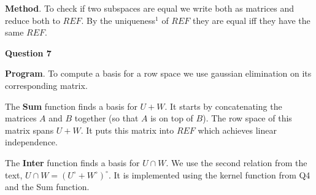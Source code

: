 \documentclass[14pt]{extarticle}
\begin{document}
\textbf{Method}. To check if two subspaces are equal we write both as matrices and reduce both to $REF$. By the uniqueness$^1$ of $REF$ they are equal iff they have the same $REF$.

\pagebreak
\begin{center}
\textbf{Question 7}
\end{center}

\textbf{Program}. To compute a basis for a row space we use gaussian elimination on its corresponding matrix. 

The \textbf{Sum} function finds a basis for $U+W$. It starts by concatenating the matrices $A$ and $B$ together (so that $A$ is on top of $B$). The row space of this matrix spans $U+W$. It puts this matrix into $REF$ which achieves linear independence. 

The \textbf{Inter} function finds a basis for $U \cap W$. We use the second relation from the text, $U \cap W = (U^{\circ} + W^{\circ})^{\circ}$. It is implemented using the kernel function from Q4 and the Sum function.
\end{document}
